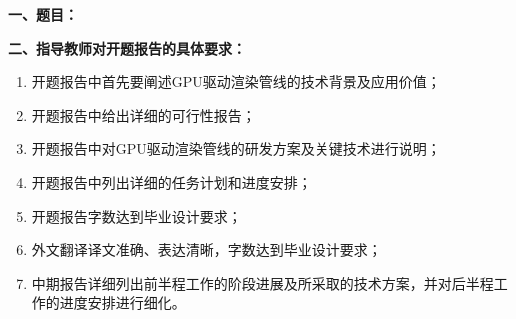 {
    \setlength{\parindent}{0em}
    \par {\bfseries 一、题目：\uline{\hfill \Title \hfill}}
    \par {\bfseries 二、指导教师对开题报告的具体要求：}

    \begin{enumerate}
        \item 开题报告中首先要阐述GPU驱动渲染管线的技术背景及应用价值；
        \item 开题报告中给出详细的可行性报告；
        \item 开题报告中对GPU驱动渲染管线的研发方案及关键技术进行说明；
        \item 开题报告中列出详细的任务计划和进度安排；
        \item 开题报告字数达到毕业设计要求；
        \item 外文翻译译文准确、表达清晰，字数达到毕业设计要求；
        \item 中期报告详细列出前半程工作的阶段进展及所采取的技术方案，并对后半程工作的进度安排进行细化。
    \end{enumerate}
}

\mbox{} \vfill

\signature{指导教师（签名）}
